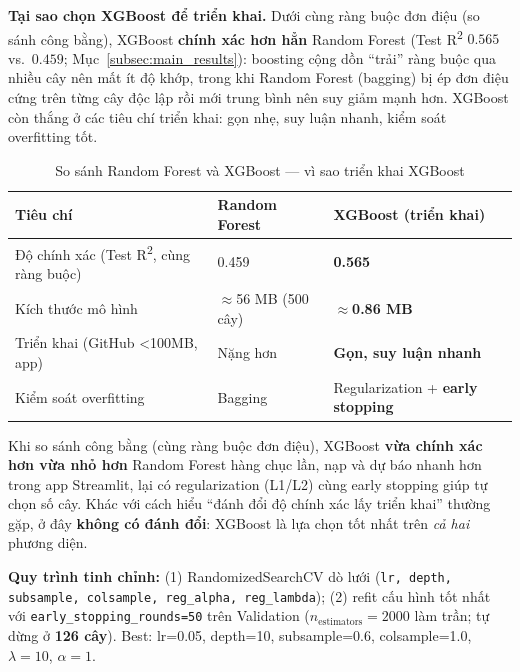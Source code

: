 \textbf{Tại sao chọn XGBoost để triển khai.} Dưới cùng ràng buộc đơn điệu (so sánh công bằng),
XGBoost \textbf{chính xác hơn hẳn} Random Forest (Test R\textsuperscript{2} $0.565$ vs.\ $0.459$;
Mục~\ref{subsec:main_results}): boosting cộng dồn ``trải'' ràng buộc qua nhiều cây nên mất ít độ
khớp, trong khi Random Forest (bagging) bị ép đơn điệu cứng trên từng cây độc lập rồi mới trung
bình nên suy giảm mạnh hơn. XGBoost còn thắng ở các tiêu chí triển khai: gọn nhẹ, suy luận nhanh,
kiểm soát overfitting tốt.

\begin{table}[H]
  \centering
  \caption{So sánh Random Forest và XGBoost — vì sao triển khai XGBoost}
  \label{tab:rf_vs_xgb}
  \begin{tabularx}{\textwidth}{@{}L{3.4cm} X X@{}}
    \toprule
    \textbf{Tiêu chí} & \textbf{Random Forest} & \textbf{XGBoost (triển khai)} \\
    \midrule
    Độ chính xác (Test R\textsuperscript{2}, cùng ràng buộc) & 0.459 & \textbf{0.565} \\
    Kích thước mô hình & $\approx$56 MB (500 cây) & \textbf{$\approx$0.86 MB} \\
    Triển khai (GitHub <100MB, app) & Nặng hơn & \textbf{Gọn, suy luận nhanh} \\
    Kiểm soát overfitting & Bagging & Regularization + \textbf{early stopping} \\
    \bottomrule
  \end{tabularx}
\end{table}

Khi so sánh công bằng (cùng ràng buộc đơn điệu), XGBoost \textbf{vừa chính xác hơn vừa nhỏ hơn}
Random Forest hàng chục lần, nạp và dự báo nhanh hơn trong app Streamlit, lại có regularization
(L1/L2) cùng early stopping giúp tự chọn số cây. Khác với cách hiểu ``đánh đổi độ chính xác lấy
triển khai'' thường gặp, ở đây \textbf{không có đánh đổi}: XGBoost là lựa chọn tốt nhất trên
\textit{cả hai} phương diện.

\textbf{Quy trình tinh chỉnh:}
(1) RandomizedSearchCV dò lưới (\texttt{lr, depth, subsample, colsample, reg\_alpha, reg\_lambda});
(2) refit cấu hình tốt nhất với \texttt{early\_stopping\_rounds=50} trên Validation
($n_\text{estimators}=2000$ làm trần; tự dừng ở \textbf{126 cây}).
Best: lr=0.05, depth=10, subsample=0.6, colsample=1.0, $\lambda=10$, $\alpha=1$.
